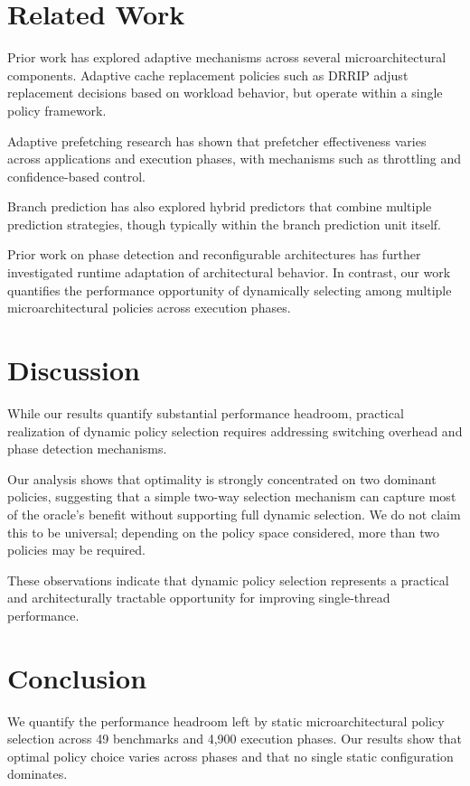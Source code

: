 \documentclass[conference]{IEEEtran}
\begin{document}
\section{Related Work}

Prior work has explored adaptive mechanisms across several
microarchitectural components. Adaptive cache replacement
policies such as DRRIP adjust replacement decisions based on
workload behavior, but operate within a single policy framework.

Adaptive prefetching research has shown that prefetcher
effectiveness varies across applications and execution phases,
with mechanisms such as throttling and confidence-based
control.

Branch prediction has also explored hybrid predictors that
combine multiple prediction strategies, though typically within
the branch prediction unit itself.

Prior work on phase detection and reconfigurable architectures
has further investigated runtime adaptation of architectural
behavior. In contrast, our work quantifies the performance
opportunity of dynamically selecting among multiple
microarchitectural policies across execution phases.

\section{Discussion}

While our results quantify substantial performance headroom, practical
realization of dynamic policy selection requires addressing switching
overhead and phase detection mechanisms.

Our analysis shows that optimality is strongly concentrated on two
dominant policies, suggesting that a simple two-way selection mechanism
can capture most of the oracle’s benefit without supporting full
dynamic selection. We do not claim this to be universal; depending on
the policy space considered, more than two policies may be required.

These observations indicate that dynamic policy selection represents a
practical and architecturally tractable opportunity for improving
single-thread performance.
\section{Conclusion}

We quantify the performance headroom left by static
microarchitectural policy selection across 49 benchmarks and
4,900 execution phases. Our results show that optimal policy
choice varies across phases and that no single static
configuration dominates.
\end{document}
